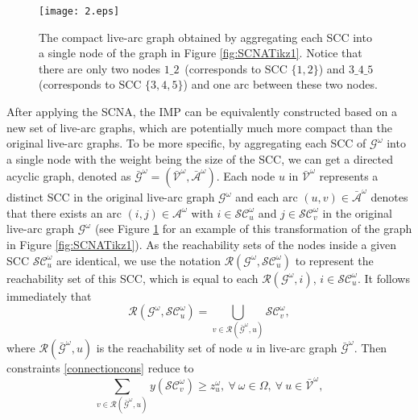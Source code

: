 \documentclass[a4paper,10pt]{article}
\newcommand{\A}{\mathcal{A}}
\theoremstyle{plain}
\newcommand{\revv}[1]{{#1}}
\begin{document}
	
	\begin{figure}[H]
		\centering
		\texttt{[image: 2.eps]}
		\caption{The compact live-arc graph obtained by aggregating each SCC into a single node of the graph in Figure \ref{fig:SCNATikz1}. Notice that there are only two nodes $1\_2$~(corresponds to SCC $\{1,2\}$) and $3\_4\_5$ (corresponds to SCC $\{3,4,5\}$) and one arc between these two nodes.}
		\label{fig:SCNATikz2}
	\end{figure}
	
	After applying the SCNA, the IMP can be equivalently constructed based on a new set of live-arc graphs, which are potentially much more compact than the original live-arc graphs.
	To be more specific, by aggregating each SCC of $\mathcal{G}^{\omega}$ into a single node with the weight being the size of the SCC, we can get a  directed acyclic graph, denoted as $\bar{\mathcal{G}}^{\omega}=(\bar{\mathcal{V}}^{\omega},\bar{\mathcal{A}}^{\omega})$.
	Each node $u$ in $\bar{\mathcal{V}}^{\omega}$ represents a distinct SCC in the original live-arc graph $\mathcal{G}^\omega$ and each arc $(u,v) \in \bar{\mathcal{A}}^{\omega}$ denotes that there exists an arc $(i,j)\in\A^{\omega}$ with $i\in\mathcal{SC}_u^{\omega}$ and $j\in\mathcal{SC}_v^{\omega}$ in the original live-arc graph $\mathcal{G}^\omega$
	(see Figure \ref{fig:SCNATikz2} for an example of this transformation of the graph in Figure \ref{fig:SCNATikz1}).
	As the reachability sets of the nodes inside a given SCC $\mathcal{SC}_u^{\omega}$ are identical, we use the notation $\mathcal{R}(\mathcal{G}^\omega,\mathcal{SC}_u^{\omega}) $ to represent the reachability set of this SCC, which is equal to each $\mathcal{R}(\mathcal{G}^\omega,\revv{i}) $, $\revv{i} \in \mathcal{SC}_u^{\omega} $.
	It follows immediately that 
	\begin{equation}
		\label{relation_reachset}
		\mathcal{R}(\mathcal{G}^\omega,\mathcal{SC}_u^{\omega}) = \bigcup_{v \in \mathcal{R}(\bar{\mathcal{G}}^\omega, u)}\mathcal{SC}_v^\omega,
	\end{equation} 
	where $\mathcal{R}(\bar{\mathcal{G}}^\omega, u)$ is the reachability set of node $u$ in live-arc graph $\bar{\mathcal{G}}^\omega$.
	Then constraints \eqref{connectioncons} reduce to 
	\begin{equation}
		\label{strongconnectioncons}
		\sum_{v\in\mathcal{R}(\bar{\mathcal{G}}^{\omega},u)}y(\mathcal{SC}_v^{\omega})\geq z_u^{\omega},~\forall~ \omega\in\Omega, ~\forall~ u\in\bar{\mathcal{V}}^{\omega}, 
	\end{equation}
\end{document}

